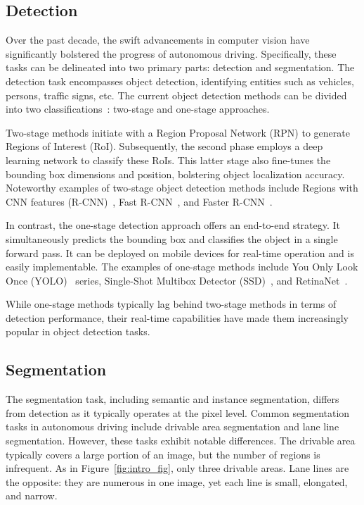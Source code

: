 \documentclass[lettersize,journal]{IEEEtran}
\begin{document}
\subsection{Detection}
Over the past decade, the swift advancements in computer vision have significantly bolstered the progress of autonomous driving. Specifically, these tasks can be delineated into two primary parts: detection and segmentation. The detection task encompasses object detection, identifying entities such as vehicles, persons, traffic signs, etc.
The current object detection methods can be divided into two classifications~\cite{zou2023object}: two-stage and one-stage approaches. 

Two-stage methods initiate with a Region Proposal Network (RPN) to generate Regions of Interest (RoI). Subsequently, the second phase employs a deep learning network to classify these RoIs. This latter stage also fine-tunes the bounding box dimensions and position, bolstering object localization accuracy. Noteworthy examples of two-stage object detection methods include Regions with CNN features (R-CNN)~\cite{girshick2014rich}, Fast R-CNN~\cite{girshick2015fast}, and Faster R-CNN~\cite{ren2015faster}. 

In contrast, the one-stage detection approach offers an end-to-end strategy. It simultaneously predicts the bounding box and classifies the object in a single forward pass. It can be deployed on mobile devices for real-time operation and is easily implementable. The examples of one-stage methods include You Only Look Once (YOLO)~\cite{redmon2016you,redmon2017yolo9000,redmon2018yolov3,wang2023yolov7} series, Single-Shot Multibox Detector (SSD)~\cite{liu2016ssd}, and RetinaNet~\cite{lin2017focal}. 

While one-stage methods typically lag behind two-stage methods in terms of detection performance, their real-time capabilities have made them increasingly popular in object detection tasks.


\subsection{Segmentation}
The segmentation task, including semantic and instance segmentation, differs from detection as it typically operates at the pixel level. Common segmentation tasks in autonomous driving include drivable area segmentation and lane line segmentation. However, these tasks exhibit notable differences. The drivable area typically covers a large portion of an image, but the number of regions is infrequent. As in Figure~\ref{fig:intro_fig}, only three drivable areas. Lane lines are the opposite: they are numerous in one image, yet each line is small, elongated, and narrow. 
\end{document}
